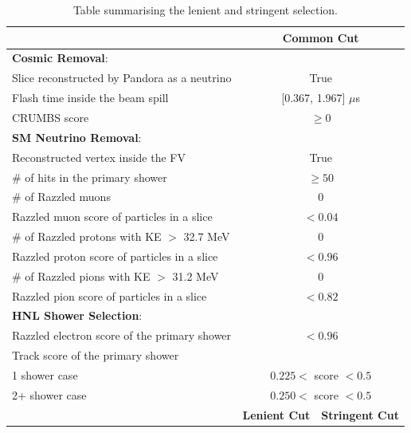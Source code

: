 \begin{table}[htbp!]
\caption{Table summarising the lenient and stringent selection.}
\label{table:cut_summary}
\centering
\begin{center}
\begin{tabular}{| p{7.75cm} | m{3.25cm} | m{3.25cm} |} 
 \hline
  & \multicolumn{2}{c|}{\textbf{Common Cut}} \\ [1ex] 
 \hline
 \textbf{Cosmic Removal}: & \multicolumn{2}{c|}{} \\ [1ex] 
 Slice reconstructed by Pandora as a neutrino & \multicolumn{2}{c|}{True} \\ 
 Flash time inside the beam spill & \multicolumn{2}{c|}{[0.367, 1.967] $\mu$s} \\ 
 CRUMBS score  & \multicolumn{2}{c|}{$\geq 0$} \\ [1ex] 
 \hline
 \textbf{SM Neutrino Removal}: & \multicolumn{2}{c|}{} \\ [1ex] 
 Reconstructed vertex inside the FV & \multicolumn{2}{c|}{True} \\
 \# of hits in the primary shower & \multicolumn{2}{c|}{$\geq 50$} \\ [1ex]
 \# of Razzled muons & \multicolumn{2}{c|}{0} \\
 Razzled muon score of particles in a slice & \multicolumn{2}{c|}{$< 0.04$} \\ [1ex]
 \# of Razzled protons with KE $>$ 32.7 MeV & \multicolumn{2}{c|}{0} \\
 Razzled proton score of particles in a slice & \multicolumn{2}{c|}{$< 0.96$} \\ [1ex]
 \# of Razzled pions with KE $>$ 31.2 MeV & \multicolumn{2}{c|}{0} \\
 Razzled pion score of particles in a slice & \multicolumn{2}{c|}{$< 0.82$} \\ [1ex]
 \hline
 \textbf{HNL Shower Selection}: & \multicolumn{2}{c|}{} \\ [1ex] 
 Razzled electron score of the primary shower & \multicolumn{2}{c|}{$< 0.96$} \\ [1ex]
 Track score of the primary shower & \multicolumn{2}{c|}{} \\
 \hspace{0.5cm}1 shower case & \multicolumn{2}{c|}{$0.225 <$ score $< 0.5$} \\
 \hspace{0.5cm}2+ shower case & \multicolumn{2}{c|}{$0.250 <$ score $< 0.5$} \\
 \cline{2-3}
 & \multicolumn{1}{c|}{\textbf{Lenient Cut}}  & \multicolumn{1}{c|}{\textbf{Stringent Cut}} \\  

\end{tabular}
\end{center}
\end{table}
